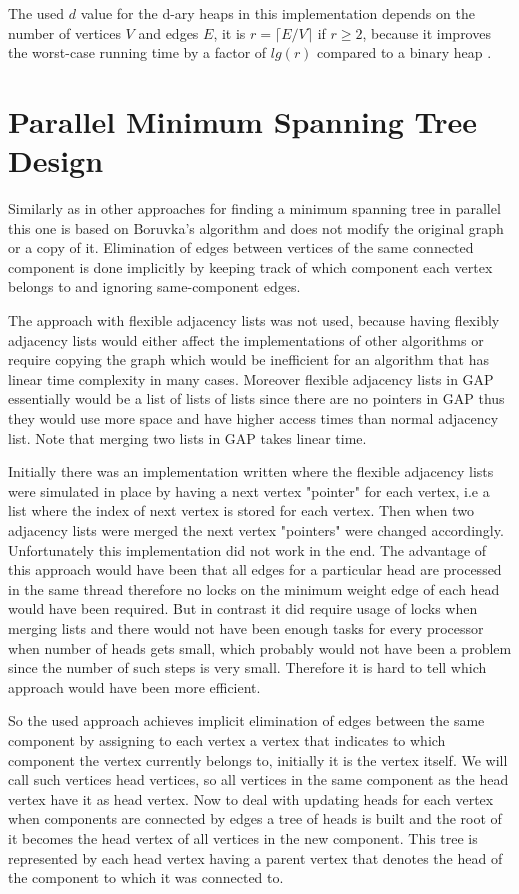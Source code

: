 \documentclass{report}
\theoremstyle{plain}
\theoremstyle{definition}
\theoremstyle{remark}
\begin{document}
The used $d$ value for the d-ary heaps in this implementation depends on the number of vertices $V$ and edges $E$, it is $r=\lceil E/V \rceil$ if $r \geq 2$, because it improves the worst-case running time by a factor of $lg(r)$ compared to a binary heap \cite{algo_sedgewick}.

\section{Parallel Minimum Spanning Tree Design}

Similarly as in other approaches \cite{Bader20061366} for finding a minimum spanning tree in parallel this one is based on Boruvka's algorithm and does not modify the original graph or a copy of it. Elimination of edges between vertices of the same connected component is done implicitly by keeping track of which component each vertex belongs to and ignoring same-component edges.

The approach with flexible adjacency lists \cite{Bader20061366} was not used, because having flexibly adjacency lists would either affect the implementations of other algorithms or require copying the graph which would be inefficient for an algorithm that has linear time complexity in many cases. Moreover flexible adjacency lists in GAP essentially would be a list of lists of lists since there are no pointers in GAP thus they would use more space and have higher access times than normal adjacency list. Note that merging two lists in GAP takes linear time.

Initially there was an implementation written where the flexible adjacency lists were simulated in place by having a next vertex "pointer" for each vertex, i.e a list where the index of next vertex is stored for each vertex. Then when two adjacency lists were merged the next vertex "pointers" were changed accordingly. Unfortunately this implementation did not work in the end. The advantage of this approach would have been that all edges for a particular head are processed in the same thread therefore no locks on the minimum weight edge of each head would have been required. But in contrast it did require usage of locks when merging lists and there would not have been enough tasks for every processor when number of heads gets small, which probably would not have been a problem since the number of such steps is very small. Therefore it is hard to tell which approach would have been more efficient.

So the used approach achieves implicit elimination of edges between the same component by assigning to each vertex a vertex that indicates to which component the vertex currently belongs to, initially it is the vertex itself. We will call such vertices head vertices, so all vertices in the same component as the head vertex have it as head vertex. Now to deal with updating heads for each vertex when components are connected by edges a tree of heads is built and the root of it becomes the head vertex of all vertices in the new component. This tree is represented by each head vertex having a parent vertex that denotes the head of the component to which it was connected to.
\end{document}
